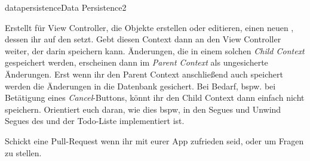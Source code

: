 \documentclass[parskip=half, final]{scrreprt}
\begin{document}
\begin{lecture}
\begin{exc}
\begin{excitem}{datapersistence}{Data Persistence}{2}
\begin{enumerate}[label=\arabic*.]
Erstellt für View Controller, die Objekte erstellen oder editieren, einen neuen , dessen  ihr auf den  setzt. Gebt diesen Context dann an den View Controller weiter, der darin speichern kann. Änderungen, die in einem solchen \emph{Child Context} gespeichert werden, erscheinen dann im \emph{Parent Context} als ungesicherte Änderungen. Erst wenn ihr den Parent Context anschließend auch speichert werden die Änderungen in die Datenbank gesichert. Bei Bedarf, bspw. bei Betätigung eines \emph{Cancel}-Buttons, könnt ihr den Child Context dann einfach nicht speichern. Orientiert euch daran, wie dies bspw, in den Segues und Unwind Segues des  und  der Todo-Liste implementiert ist.

\end{enumerate}

Schickt eine Pull-Request wenn ihr mit eurer App zufrieden seid, oder um Fragen zu stellen.


\end{excitem}


\end{exc}



\end{lecture}
\end{document}
